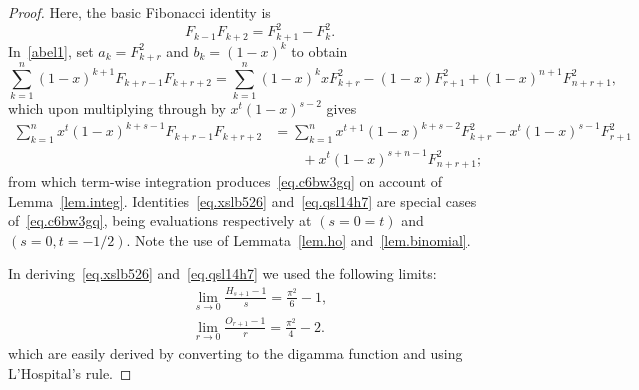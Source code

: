 \documentclass[12pt,reqno]{article}
\begin{document}
	\begin{proof}
		Here, the basic Fibonacci identity is
		\begin{equation*}
			F_{k - 1} F_{k + 2} = F_{k + 1}^2 - F_k^2.
		\end{equation*}
		In~\eqref{abel1}, set $a_k=F_{k+r}^2$ and $b_k=(1-x)^k$ to obtain
		\begin{equation*}
			\sum_{k = 1}^n (1 - x)^{k + 1} F_{k + r - 1} F_{k + r + 2} = \sum_{k = 1}^n (1 - x)^k x F_{k + r}^2 - (1 - x)F_{r + 1}^2
			+ (1 - x)^{n + 1} F_{n + r + 1}^2,
		\end{equation*}
		which upon multiplying through by $x^t(1-x)^{s-2}$ gives
		\begin{equation*}
			\begin{split}
				\sum_{k = 1}^n {x^t \left( {1 - x} \right)^{k + s - 1} F_{k + r - 1} F_{k + r + 2} }  &= \sum_{k = 1}^n {x^{t + 1} \left( {1 - x} \right)^{k + s - 2} F_{k + r}^2 }  - x^t \left( {1 - x} \right)^{s - 1} F_{r + 1}^2\\
				&\qquad + x^t \left( {1 - x} \right)^{s + n - 1} F_{n + r + 1}^2 ;
			\end{split}
		\end{equation*}
		from which term-wise integration produces~\eqref{eq.c6bw3gq} on account of Lemma~\ref{lem.integ}. Identities~\eqref{eq.xslb526} and~\eqref{eq.qsl14h7} are special cases of~\eqref{eq.c6bw3gq}, being evaluations respectively at $(s=0=t)$ and \mbox{$(s=0,t=-1/2)$}. Note the use of Lemmata~\ref{lem.ho} and~\ref{lem.binomial}.
		
		In deriving~\eqref{eq.xslb526} and~\eqref{eq.qsl14h7} we used the following limits:
		\begin{gather*}
			\lim_{s\to 0}\frac{H_{s + 1} - 1}{s} = \frac{\pi^2}{6} - 1,\\
			\lim_{r\to 0}\frac{O_{r + 1} - 1}{r} = \frac{\pi^2}{4} - 2.
		\end{gather*}
		which are easily derived by converting to the digamma function and using L'Hospital's rule.
	\end{proof}
	
\end{document}
